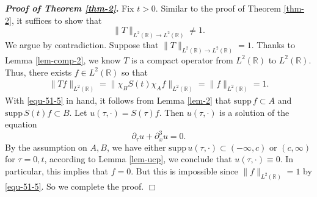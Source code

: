 \documentclass[preprint,12pt]{elsarticle}
\def\R {\mathbb{R}}
\def\d{{\,\rm d}}
\newtheorem{theorem}{Theorem}[section]
\newtheorem{definition}{Definition}[section]
\newtheorem{example}[theorem]{Examples}
\begin{document}
{\bf \textit{Proof of Theorem \ref{thm-2}}.} Fix $t>0$. Similar to the proof of Theorem \ref{thm-2}, it suffices to show that $$
\|T\|_{L^2(\R)\to L^2(\R)}\neq 1.
$$
We argue by contradiction. Suppose that $\|T\|_{L^2(\R)\to L^2(\R)}= 1$. Thanks to Lemma \ref{lem-comp-2}, we know $T$ is a compact operator from $L^2(\R)$ to $L^2(\R)$. Thus, there exists $f\in L^2(\R)$ so that
\begin{align}\label{equ-51-5}
\|Tf\|_{L^2(\R)}=\|\chi_BS(t)\chi_Af\|_{L^2(\R)}=\|f\|_{L^2(\R)}=1.
\end{align}
With \eqref{equ-51-5} in hand, it follows from Lemma \ref{lem-2} that $\mathrm{supp }\, f\subset A$ and $\mathrm{supp }\, S(t)f \subset B$. Let $u(\tau,\cdot)=S(\tau)f$. Then $u(\tau,\cdot)$ is a solution of the equation
$$
\partial_\tau u+\partial_x^3u=0.
$$
By the assumption on $A,B$, we have either $\mathrm{supp }\,u(\tau,\cdot)\subset (-\infty,c)$ or $(c,\infty)$ for $\tau=0,t$, according to Lemma \ref{lem-ucp}, we conclude that $u(\tau,\cdot)\equiv 0$. In particular, this implies that $f=0$. But this is impossible since $\|f\|_{L^2(\R)}=1$ by \eqref{equ-51-5}. So we complete the proof. $\Box$
%
%
\end{document}
